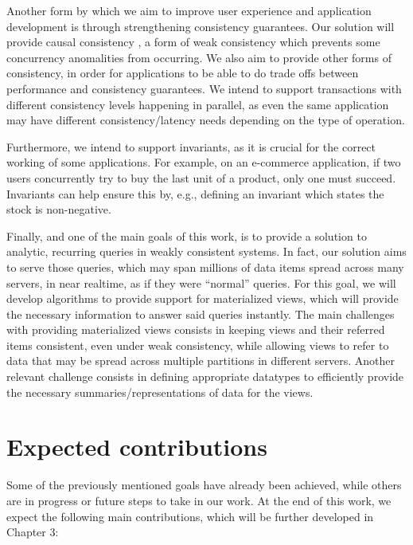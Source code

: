 Another form by which we aim to improve user experience and application development is through strengthening consistency guarantees.
Our solution will provide causal consistency \cite{???}, a form of weak consistency which prevents some concurrency anomalities from occurring.
We also aim to provide other forms of consistency, in order for applications to be able to do trade offs between performance and consistency guarantees.
We intend to support transactions with different consistency levels happening in parallel, as even the same application may have different consistency/latency needs depending on the type of operation.

Furthermore, we intend to support invariants, as it is crucial for the correct working of some applications.
For example, on an e-commerce application, if two users concurrently try to buy the last unit of a product, only one must succeed.
Invariants can help ensure this by, e.g., defining an invariant which states the stock is non-negative.

Finally, and one of the main goals of this work, is to provide a solution to analytic, recurring queries in weakly consistent systems.
In fact, our solution aims to serve those queries, which may span millions of data items spread across many servers, in near realtime, as if they were ``normal'' queries.
For this goal, we will develop algorithms to provide support for materialized views, which will provide the necessary information to answer said queries instantly.
The main challenges with providing materialized views consists in keeping views and their referred items consistent, even under weak consistency, while allowing views to refer to data that may be spread across multiple partitions in different servers.
Another relevant challenge consists in defining appropriate datatypes to efficiently provide the necessary summaries/representations of data for the views.

\section{Expected contributions}

Some of the previously mentioned goals have already been achieved, while others are in progress or future steps to take in our work.
At the end of this work, we expect the following main contributions, which will be further developed in Chapter 3:


